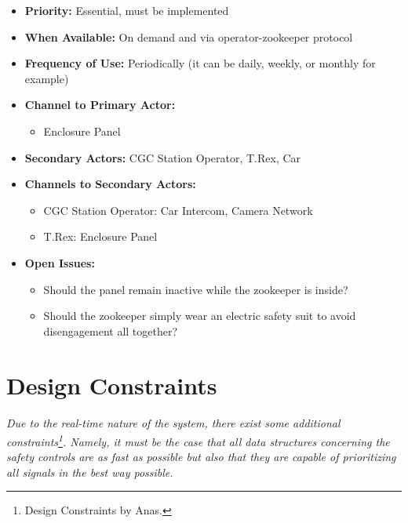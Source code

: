 \documentclass[12pt]{article}
\begin{document}
\begin{itemize}
        \item[]\textbf{Priority:}
            Essential, must be implemented

        \item[]\textbf{When Available:}
            On demand and via operator-zookeeper protocol

        \item[]\textbf{Frequency of Use:}
            Periodically (it can be daily, weekly, or monthly for example)

        \item[]\textbf{Channel to Primary Actor:}
            \begin{itemize}
                \item[] Enclosure Panel
            \end{itemize}

        \item[]\textbf{Secondary Actors:}
            CGC Station Operator, T.Rex, Car
        
        \item[]\textbf{Channels to Secondary Actors:}
            \begin{itemize}
                \item[] CGC Station Operator: Car Intercom, Camera Network
                \item[] T.Rex: Enclosure Panel
            \end{itemize}

        \item[]\textbf{Open Issues:}
            \begin{itemize}
                \item[] Should the panel remain inactive while 
                the zookeeper is inside?
                \item[] Should the zookeeper simply wear an electric 
                safety suit to avoid disengagement all together?
            \end{itemize}
    \end{itemize}
    

\pagebreak
\section{Design Constraints} \label{cons}
\paragraph{} \textit{Due to the real-time nature of the system, there exist some additional 
constraints\footnote{Design Constraints by Anas.}. Namely, it must be the case that all data 
structures concerning the safety controls are as fast as possible but also that they are capable 
of prioritizing all signals in the best way possible.}
\end{document}
